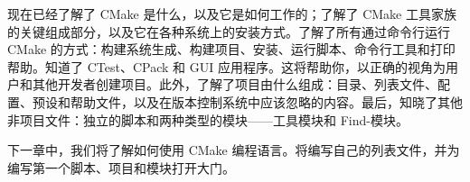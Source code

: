 现在已经了解了 CMake 是什么，以及它是如何工作的；了解了 CMake 工具家族的关键组成部分，以及它在各种系统上的安装方式。了解了所有通过命令行运行 CMake 的方式：构建系统生成、构建项目、安装、运行脚本、命令行工具和打印帮助。知道了 CTest、CPack 和 GUI 应用程序。这将帮助你，以正确的视角为用户和其他开发者创建项目。此外，了解了项目由什么组成：目录、列表文件、配置、预设和帮助文件，以及在版本控制系统中应该忽略的内容。最后，知晓了其他非项目文件：独立的脚本和两种类型的模块——工具模块和 Find-模块。

下一章中，我们将了解如何使用 CMake 编程语言。将编写自己的列表文件，并为编写第一个脚本、项目和模块打开大门。
